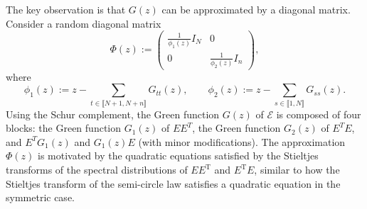 \documentclass[reqno]{amsart}
\newcommand{\T}{\mathrm{T}}
\theoremstyle{plain}
\theoremstyle{definition}
\begin{document}
The key observation is that $G(z)$ can be approximated by a diagonal matrix. 
Consider a random diagonal matrix 
\begin{equation}\label{eq:Phi}
 \Phi(z):=\begin{pmatrix}
\frac{1}{\phi_1(z)}I_N & 0 \\
0 &\frac{1}{\phi_2(z)}I_n
\end{pmatrix},
\end{equation}
where 
\begin{equation}\label{eq:phi12}
\phi_1(z):= z - \sum_{t \in \llbracket N+1,N+n \rrbracket} G_{tt}(z),\qquad\phi_2(z):= z - \sum_{s \in \llbracket 1,N \rrbracket} G_{ss}(z).
\end{equation}
Using the Schur complement, the Green function $G(z)$ of $\mathcal E$ is composed of four blocks: the Green function $G_1(z)$ of $EE^T$, the Green function $G_2(z)$ of $E^TE$, and $E^TG_1(z)$ and $G_1(z)E$ (with minor modifications). The approximation $\Phi(z)$ is motivated by the quadratic equations satisfied by the Stieltjes transforms of the spectral distributions of $EE^\T$ and $E^\T E$, similar to how the Stieltjes transform of the semi-circle law satisfies a quadratic equation in the symmetric case.
\end{document}
